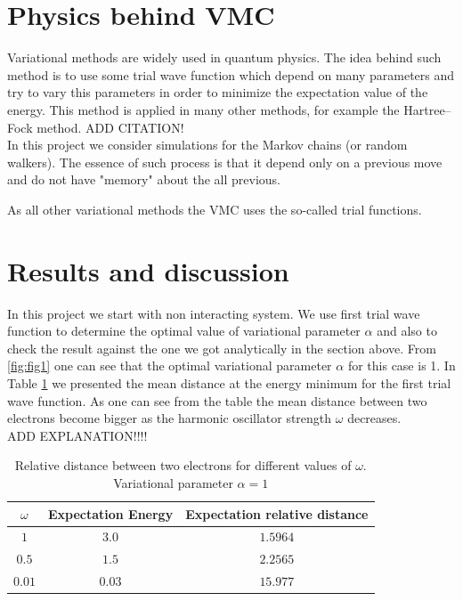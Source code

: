 \documentclass[10pt]{article}
\begin{document}
\newpage
\section{Physics behind  VMC}\label{Part1}
Variational methods are widely used in quantum physics. The idea behind such method is to use some trial wave function which depend on many parameters and try to vary this parameters in order to minimize the expectation value of the energy. This method is applied in many other methods, for example the Hartree–Fock method. ADD CITATION!\\
In this project we consider simulations for the Markov chains (or random walkers). The essence of such process is that it depend only on a previous move and do not have "memory" about the all previous.


As all other variational methods the VMC uses the so-called trial functions. 




\newpage
\section{Results and discussion}\label{results}

In this project we start with non interacting system. We use first trial wave function to determine the optimal value of variational parameter $\alpha$ and also to check the result against the one we got analytically in the section above. From \ref{fig:fig1} one can see that the optimal variational parameter $\alpha$ for this case is 1. In Table \ref{tab:one} we presented the mean distance at the energy minimum for the first trial wave function. As one can see from the table the mean distance between two electrons become bigger as the harmonic oscillator strength $\omega$ decreases. \\
ADD EXPLANATION!!!!

\begin{table}[h!]
  \caption{Relative distance between two electrons for different values of $\omega$. Variational parameter $\alpha =1$}
  \label{tab:one}
  \begin{center}
    \begin{tabular}{c|c|c}
    \hline
		$\omega$& Expectation Energy & Expectation relative distance \\
    \hline
	$	1 $  & $3.0$ & $1.5964$  \\
	$	0.5$  & $1.5$ & $2.2565$   \\
	$	0.01$  & $0.03$ &  $15.977$   \\
	\end{tabular}
  \end{center}
\end{table}
\end{document}
